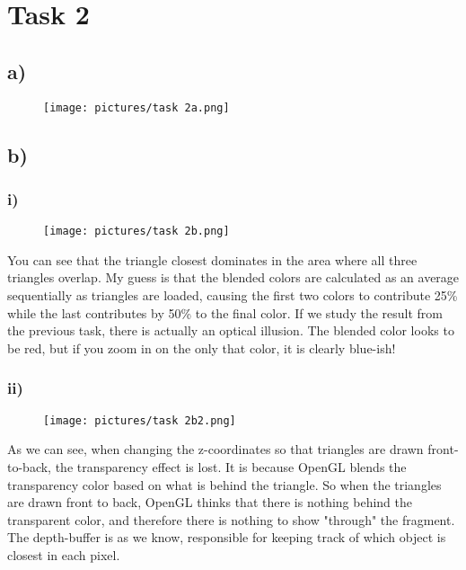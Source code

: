 \section{Task 2}

\subsection{a)}
\begin{figure}[h!]
    \centering
    \texttt{[image: pictures/task 2a.png]}
\end{figure}

\subsection{b)}
\subsubsection{i)}
\begin{figure}[H]
    \centering
    \texttt{[image: pictures/task 2b.png]}
\end{figure}
You can see that the triangle closest dominates in the area where all three triangles overlap. My guess is that the blended colors are calculated as an average sequentially as triangles are loaded, causing the first two colors to contribute 25\% while the last contributes by 50\% to the final color.
If we study the result from the previous task, there is actually an optical illusion. The blended color looks to be red, but if you zoom in on the only that color, it is clearly blue-ish!

\subsubsection{ii)}
\begin{figure}[h!]
    \centering
    \texttt{[image: pictures/task 2b2.png]}
\end{figure}
As we can see, when changing the z-coordinates so that triangles are drawn front-to-back, the transparency effect is lost. It is because OpenGL blends the transparency color based on what is behind the triangle. So when the triangles are drawn front to back, OpenGL thinks that there is nothing behind the transparent color, and therefore there is nothing to show "through" the fragment. 
The depth-buffer is as we know, responsible for keeping track of which object is closest in each pixel.



        


